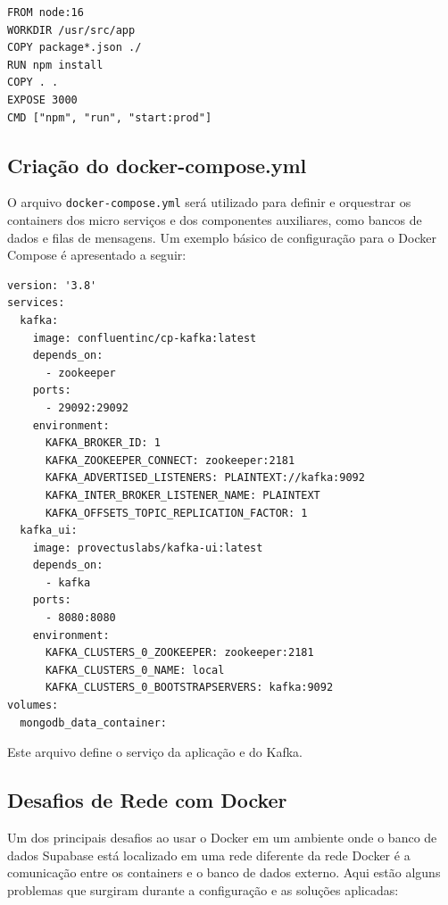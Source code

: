 \begin{verbatim}
FROM node:16
WORKDIR /usr/src/app
COPY package*.json ./
RUN npm install
COPY . .
EXPOSE 3000
CMD ["npm", "run", "start:prod"]
\end{verbatim}

\subsection{Criação do docker-compose.yml}
O arquivo \texttt{docker-compose.yml} será utilizado para definir e orquestrar os containers dos micro serviços e dos componentes auxiliares, como bancos de dados e filas de mensagens. Um exemplo básico de configuração para o Docker Compose é apresentado a seguir:

\begin{verbatim}
version: '3.8'
services:
  kafka:
    image: confluentinc/cp-kafka:latest
    depends_on:
      - zookeeper
    ports:
      - 29092:29092
    environment:
      KAFKA_BROKER_ID: 1
      KAFKA_ZOOKEEPER_CONNECT: zookeeper:2181
      KAFKA_ADVERTISED_LISTENERS: PLAINTEXT://kafka:9092
      KAFKA_INTER_BROKER_LISTENER_NAME: PLAINTEXT
      KAFKA_OFFSETS_TOPIC_REPLICATION_FACTOR: 1
  kafka_ui:
    image: provectuslabs/kafka-ui:latest
    depends_on:
      - kafka
    ports:
      - 8080:8080
    environment:
      KAFKA_CLUSTERS_0_ZOOKEEPER: zookeeper:2181
      KAFKA_CLUSTERS_0_NAME: local
      KAFKA_CLUSTERS_0_BOOTSTRAPSERVERS: kafka:9092
volumes:
  mongodb_data_container:
\end{verbatim}

Este arquivo define o serviço da aplicação e do Kafka.

\subsection{Desafios de Rede com Docker}

Um dos principais desafios ao usar o Docker em um ambiente onde o banco de dados Supabase está localizado em uma rede diferente da rede Docker é a comunicação entre os containers e o banco de dados externo. Aqui estão alguns problemas que surgiram durante a configuração e as soluções aplicadas:

